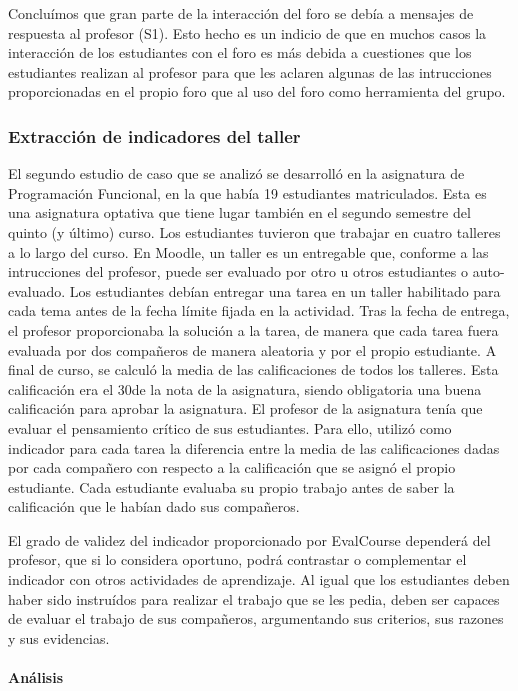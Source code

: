 Concluímos que gran parte de la interacción del foro se debía a mensajes de respuesta al profesor (S1). Esto hecho es un indicio de que en muchos casos la interacción de los estudiantes con el foro es más debida a cuestiones que los estudiantes realizan al profesor para que les aclaren algunas de las intrucciones proporcionadas en el propio foro que al uso del foro como herramienta del grupo.

\subsubsection{Extracción de indicadores del taller}

El segundo estudio de caso que se analizó se desarrolló en la asignatura de Programación Funcional, en la que había 19 estudiantes matriculados. Esta es una asignatura optativa que tiene lugar también en el segundo semestre del quinto (y último) curso. Los estudiantes tuvieron que trabajar en cuatro talleres a lo largo del curso. En Moodle, un taller es un entregable que, conforme a las intrucciones del profesor, puede ser evaluado por otro u otros estudiantes o auto-evaluado. Los estudiantes debían entregar una tarea en un taller habilitado para cada tema antes de la fecha límite fijada en la actividad. Tras la fecha de entrega, el profesor proporcionaba la solución a la tarea, de manera que cada tarea fuera evaluada por dos compañeros de manera aleatoria y por el propio estudiante. A final de curso, se calculó la media de las calificaciones de todos los talleres. Esta calificación era el 30\percentage de la nota de la asignatura, siendo obligatoria una buena calificación para aprobar la asignatura. El profesor de la asignatura tenía que evaluar el pensamiento crítico de sus estudiantes. Para ello, utilizó como indicador para cada tarea la diferencia entre la media de las calificaciones dadas por cada compañero con respecto a la calificación que se asignó el propio estudiante. Cada estudiante evaluaba su propio trabajo antes de saber la calificación que le habían dado sus compañeros.

El grado de validez del indicador proporcionado por EvalCourse dependerá del profesor, que si lo considera oportuno, podrá contrastar o complementar el indicador con otros actividades de aprendizaje. Al igual que los estudiantes deben haber sido instruídos para realizar el trabajo que se les pedia, deben ser capaces de evaluar el trabajo de sus compañeros, argumentando sus criterios, sus razones y sus evidencias.

\paragraph*{Análisis}

